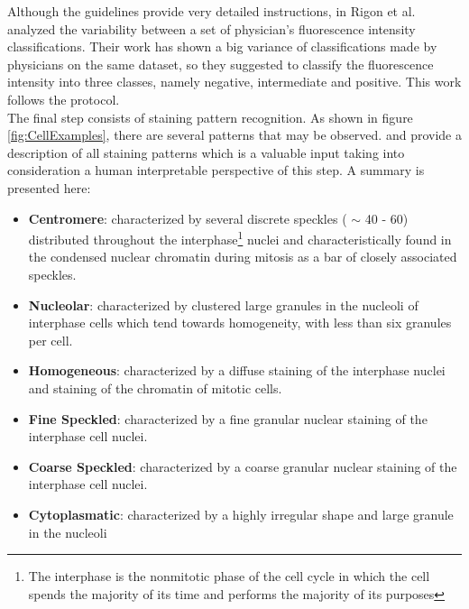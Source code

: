 Although the guidelines provide  very detailed instructions, in \cite{Rigon2007} Rigon et al. analyzed the variability between a set of physician's fluorescence intensity  classifications. Their work has shown a big variance of classifications made by physicians on the same dataset, so they suggested to classify the fluorescence intensity into three classes, namely negative, intermediate and positive. This work follows the protocol. \\

The final step consists of staining pattern recognition. As shown in figure \ref{fig:CellExamples}, there are several patterns that may be observed. \cite{FoggiaBenchmarks2013} and \cite{Perner02miningknowledge} provide a description of all staining patterns which is a valuable input taking into consideration a human interpretable perspective of this step. A summary is presented here:
\begin{itemize}

	\item \textbf{Centromere}: characterized by several discrete speckles ( $\sim$ 40 - 60) distributed throughout the interphase\footnote{The interphase is the nonmitotic phase of the cell cycle in which the cell spends the majority of its time and performs the majority of its purposes} nuclei and characteristically found in the condensed nuclear chromatin during mitosis as a bar of closely associated speckles.
	
	\item \textbf{Nucleolar}: characterized by clustered large granules in
the nucleoli of interphase cells which tend towards homogeneity, with less than six granules per cell.

	\item \textbf{Homogeneous}: characterized by a diffuse staining of the interphase nuclei and staining of the chromatin of mitotic cells.
	
	\item \textbf{Fine Speckled}: characterized by a fine granular nuclear staining of the interphase cell nuclei.
	
	\item \textbf{Coarse Speckled}: characterized by a coarse granular nuclear staining of the interphase cell nuclei.
	
	\item \textbf{Cytoplasmatic}: characterized by a highly irregular shape and large granule in the nucleoli

\end{itemize}